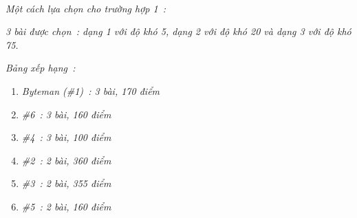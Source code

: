  

\emph{Một cách lựa chọn cho trường hợp 1 : }

\emph{3 bài được chọn : dạng 1 với độ khó 5, dạng 2 với độ khó 20 và dạng 3 với độ khó 75. }

\emph{Bảng xếp hạng : }
\begin{enumerate}
	\item 

\emph{Byteman (\#1) : 3 bài, 170 điểm }
	\item 

\emph{\#6 : 3 bài, 160 điểm }
	\item 

\emph{\#4 : 3 bài, 100 điểm }
	\item 

\emph{\#2 : 2 bài, 360 điểm }
	\item 

\emph{\#3 : 2 bài, 355 điểm }
	\item 

\emph{\#5 : 2 bài, 160 điểm }
\end{enumerate}